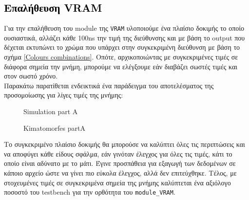 \documentclass[12pt,a4paper]{article}
\begin{document}
	
	
	
	
	\subsection{\textcolor{black}{Επαλήθευση VRAM} }
	Για την επαλήθευση του module της \verb*|VRAM| υλοποιούμε ένα πλαίσιο δοκιμής το οποίο ουσιαστικά, αλλάζει κάθε 100ns την τιμή της διεύθυνσης και με βάση το output που δέχεται εκτυπώνει το χρώμα που υπάρχει στην συγκεκριμένη διεύθυνση με βάση το σχήμα \ref{Colours combinations}. Οπότε, αρχικοποιώντας με συγκεκριμένες τιμές σε διάφορα σημεία την μνήμη, μπορούμε να ελέγξουμε εάν διαβάζει σωστές τιμές και στον σωστό χρόνο.\\ 
	Παρακάτω παρατίθεται ενδεικτικά ένα παράδειγμα του αποτελέσματος της προσομοίωσης για λίγες τιμές της μνήμης:
	
	\begin{figure} [htbp]
		\caption{Simulation part A}
		\label{Simulation part A}
	\end{figure}

	\begin{figure} [htbp]
	\caption{Kimatomorfes partA}
	\label{Kimatomorfes partA}
	\end{figure}
	Το συγκεκριμένο πλαίσιο δοκιμής θα μπορούσε να καλύπτει όλες τις περιπτώσεις και να αποφύγει κάθε είδους σφάλμα, εάν γινόταν έλεγχος για όλες τις τιμές, κάτι το οποίο είναι αδύνατο με το μάτι. Έγινε προσπάθεια για εξαγωγή των δεδομένων σε κάποιο αρχείο ώστε να γίνει πιο εύκολα έλεγχος, αλλά δεν επιτεύχθηκε. Τέλος, με στοχευμένες τιμές σε συγκεκριμένα σημεία της μνήμης καλύπτεται ένα αξιόλογο ποσοστό του testbench για την ορθότητα του \verb*|module_VRAM|.
\end{document}
